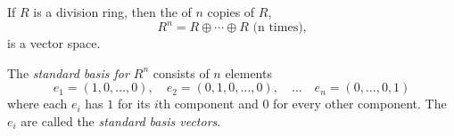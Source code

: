 \documentclass[12pt]{article}
\begin{document}

If $R$ is a division ring, then the  of $n$ copies of $R$,
\[ R^n = R \oplus\dotsb\oplus R\text{  (n times),}\]
is a vector space.


The \emph{standard basis for $R^n$} consists of $n$ elements
\[ e_1 = (1,0,\dotsc ,0), \quad e_2 = (0,1,0,\dotsc ,0),\quad \dotsc \quad e_n = (0,\dotsc ,0,1) \]
where each $e_i$ has $1$ for its $i$th component and $0$ for every other component.  
The $e_i$ are called the \emph{standard basis vectors}.



\end{document}
